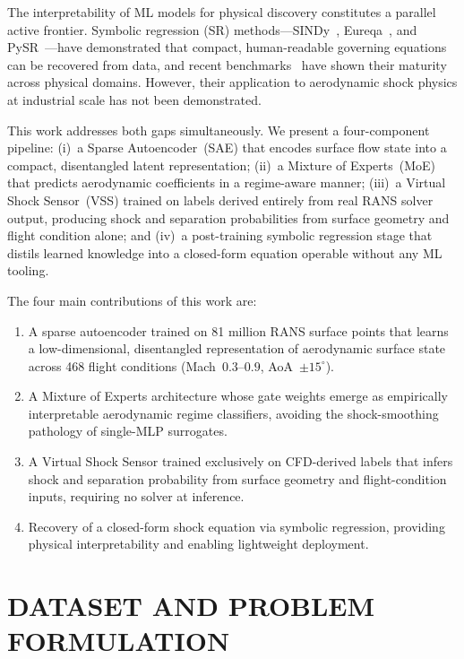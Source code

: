 \documentclass{WCCM-ECCOMAS_2026_Full_Paper}
\begin{document}
The interpretability of ML models for physical discovery constitutes
a parallel active frontier.  Symbolic regression (SR)
methods---SINDy~\cite{Brunton2016}, Eureqa~\cite{Schmidt2009}, and
PySR~\cite{Cranmer2020}---have demonstrated that compact,
human-readable governing equations can be recovered from data, and
recent benchmarks~\cite{LaCava2021,Angelis2023} have shown their
maturity across physical domains.  However, their application to
aerodynamic shock physics at industrial scale has not been
demonstrated.

This work addresses both gaps simultaneously.  We present a
four-component pipeline: (i)~a Sparse Autoencoder~(SAE) that encodes
surface flow state into a compact, disentangled latent representation;
(ii)~a Mixture of Experts~(MoE) that predicts aerodynamic coefficients
in a regime-aware manner; (iii)~a Virtual Shock Sensor~(VSS) trained
on labels derived entirely from real RANS solver output, producing
shock and separation probabilities from surface geometry and flight
condition alone; and (iv)~a post-training symbolic regression stage
that distils learned knowledge into a closed-form equation operable
without any ML tooling.

The four main contributions of this work are:
\begin{enumerate}
  \item A sparse autoencoder trained on 81 million RANS surface points
        that learns a low-dimensional, disentangled representation of
        aerodynamic surface state across 468 flight conditions
        (Mach~$0.3$--$0.9$, AoA~$\pm 15^{\circ}$).
  \item A Mixture of Experts architecture whose gate weights emerge as
        empirically interpretable aerodynamic regime classifiers,
        avoiding the shock-smoothing pathology of single-MLP
        surrogates.
  \item A Virtual Shock Sensor trained exclusively on CFD-derived
        labels that infers shock and separation probability from
        surface geometry and flight-condition inputs, requiring no
        solver at inference.
  \item Recovery of a closed-form shock equation via symbolic
        regression, providing physical interpretability and enabling
        lightweight deployment.
\end{enumerate}

\section{DATASET AND PROBLEM FORMULATION}
\end{document}
